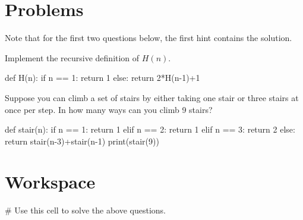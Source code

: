 \documentclass{ximera}
\begin{document}
\section{Problems}

Note that for the first two questions below, the first hint contains the solution.

\begin{question}
Implement the recursive definition of $H(n)$.
	\begin{hint}
\begin{sageCell}
def H(n):
        if n == 1:
                return 1
        else:
		return 2*H(n-1)+1
\end{sageCell}
	\end{hint}
\end{question}

\begin{question}
Suppose you can climb a set of stairs by either taking one stair or three stairs at once per step. In how many ways can you climb 9 stairs?
	\begin{hint}
\begin{sageCell}
def stair(n):
        if n == 1:
                return 1
        elif n == 2:
                return 1
        elif n == 3:
                return 2
        else:
                return stair(n-3)+stair(n-1)
print(stair(9))
\end{sageCell}
\end{hint}
\end{question}


\section{Workspace}

\begin{sageCell}
# Use this cell to solve the above questions.
\end{sageCell}
\end{document}

